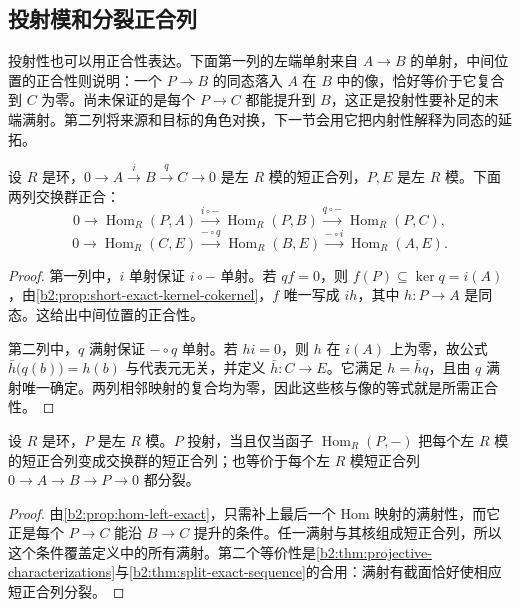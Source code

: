 \subsection{投射模和分裂正合列}
\label{b2:subsec:0701:02}

投射性也可以用正合性表达。下面第一列的左端单射来自 \(A\to B\) 的单射，中间位置的正合性则说明：一个 \(P\to B\) 的同态落入 \(A\) 在 \(B\) 中的像，恰好等价于它复合到 \(C\) 为零。尚未保证的是每个 \(P\to C\) 都能提升到 \(B\)，这正是投射性要补足的末端满射。第二列将来源和目标的角色对换，下一节会用它把内射性解释为同态的延拓。

\begin{proposition}\label{b2:prop:hom-left-exact}
	设 \(R\) 是环，\(0\to A\xrightarrow{i}B\xrightarrow{q}C\to0\) 是左 \(R\) 模的短正合列，\(P,E\) 是左 \(R\) 模。下面两列交换群正合：
	\[
		0\longrightarrow\operatorname{Hom}_R(P,A) \xrightarrow{i\circ-}\operatorname{Hom}_R(P,B) \xrightarrow{q\circ-}\operatorname{Hom}_R(P,C),
	\]
	\[
		0\longrightarrow\operatorname{Hom}_R(C,E) \xrightarrow{-\circ q}\operatorname{Hom}_R(B,E) \xrightarrow{-\circ i}\operatorname{Hom}_R(A,E).
	\]
\end{proposition}
\begin{proof}
	第一列中，\(i\) 单射保证 \(i\circ-\) 单射。若 \(qf=0\)，则 \(f(P)\subseteq\ker q=i(A)\)，由\cref{b2:prop:short-exact-kernel-cokernel}，\(f\) 唯一写成 \(ih\)，其中 \(h:P\to A\) 是同态。这给出中间位置的正合性。

	第二列中，\(q\) 满射保证 \(-\circ q\) 单射。若 \(hi=0\)，则 \(h\) 在 \(i(A)\) 上为零，故公式 \(\bar h\bigl(q(b)\bigr)=h(b)\) 与代表元无关，并定义 \(\bar h:C\to E\)。它满足 \(h=\bar hq\)，且由 \(q\) 满射唯一确定。两列相邻映射的复合均为零，因此这些核与像的等式就是所需正合性。
\end{proof}

\begin{corollary}\label{b2:cor:projective-hom-exact}
	设 \(R\) 是环，\(P\) 是左 \(R\) 模。\(P\) 投射，当且仅当函子 \(\operatorname{Hom}_R(P,-)\) 把每个左 \(R\) 模的短正合列变成交换群的短正合列；也等价于每个左 \(R\) 模短正合列 \(0\to A\to B\to P\to0\) 都分裂。
\end{corollary}
\begin{proof}
	由\cref{b2:prop:hom-left-exact}，只需补上最后一个 Hom 映射的满射性，而它正是每个 \(P\to C\) 能沿 \(B\to C\) 提升的条件。任一满射与其核组成短正合列，所以这个条件覆盖定义中的所有满射。第二个等价性是\cref{b2:thm:projective-characterizations}与\cref{b2:thm:split-exact-sequence}的合用：满射有截面恰好使相应短正合列分裂。
\end{proof}

